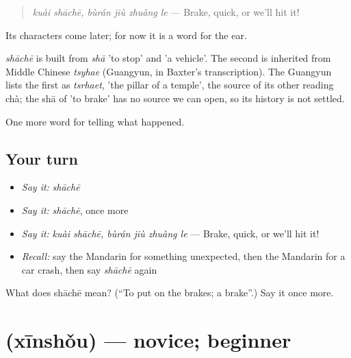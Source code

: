 \begin{quote}
\emph{kuài shāchē, bùrán jiù zhuàng le} — Brake, quick, or we'll hit it!
\end{quote}

Its characters come later; for now it is a word for the ear.

\begin{cousinweb}
\emph{shāchē} is built from \emph{shā} 'to stop' and  'a vehicle'. The second is inherited from Middle Chinese \emph{tsyhae} (Guangyun, in Baxter's transcription). The Guangyun lists the first as \emph{tsrhaet}, 'the pillar of a temple', the source of its other reading chà; the shā of 'to brake' has no source we can open, so its history is not settled.
\end{cousinweb}

\begin{grammarlens}[title={What you've built}]
One more word for telling what happened.
\end{grammarlens}

\subsection*{Your turn}
\begin{itemize}
\raggedright
  \item \emph{Say it:} \emph{shāchē}
  \item \emph{Say it:} \emph{shāchē}, once more
  \item \emph{Say it:} \emph{kuài shāchē, bùrán jiù zhuàng le} — Brake, quick, or we'll hit it!
  \item \emph{Recall:} say the Mandarin for something unexpected, then the Mandarin for a car crash, then say \emph{shāchē} again
\end{itemize}

\begin{tcolorbox}[breakable,colback=teal!4,colframe=teal!35!black,title={Before you move on}]
What does shāchē mean? (\textquotedblleft{}To put on the brakes; a brake\textquotedblright{}.) Say it once more.
\end{tcolorbox}
\section[\texorpdfstring{\zh{新手} (xīnshǒu)}{新手 (xīnshǒu)}]{ (xīnshǒu) — novice; beginner}

\label{lesson:ZH-C296-xinshou}



